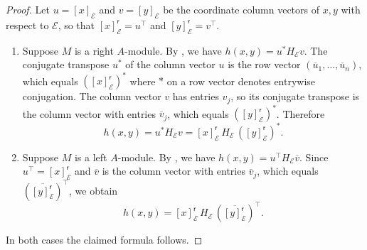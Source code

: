 \begin{proof}
    Let $u = [x]_\mathcal{E}$ and $v = [y]_\mathcal{E}$ be the coordinate column vectors of $x,y$ with respect to $\mathcal{E}$, so that $[x]_\mathcal{E}^{\mathsf{r}} = u^\top$ and $[y]_\mathcal{E}^{\mathsf{r}} = v^\top$.

    \begin{enumerate}
        \item Suppose $M$ is a right $A$-module. By , we have $h(x,y) = u^* H_\mathcal{E} v$. The conjugate transpose $u^*$ of the column vector $u$ is the row vector $(\overline{u}_1,\ldots,\overline{u}_n)$, which equals $([x]_\mathcal{E}^{\mathsf{r}})^*$ where $*$ on a row vector denotes entrywise conjugation. The column vector $v$ has entries $v_j$, so its conjugate transpose is the column vector with entries $\overline{v}_j$, which equals $([y]_\mathcal{E}^{\mathsf{r}})^*$. Therefore
        $$h(x,y) = u^* H_\mathcal{E} v = [x]_\mathcal{E}^{\mathsf{r}} \, H_\mathcal{E} \, ([y]_\mathcal{E}^{\mathsf{r}})^*.$$

        \item Suppose $M$ is a left $A$-module. By , we have $h(x,y) = u^\top H_\mathcal{E} \overline{v}$. Since $u^\top = [x]_\mathcal{E}^{\mathsf{r}}$ and $\overline{v}$ is the column vector with entries $\overline{v}_j$, which equals $(\overline{[y]_\mathcal{E}^{\mathsf{r}}})^\top$, we obtain
        $$h(x,y) = [x]_\mathcal{E}^{\mathsf{r}} \, H_\mathcal{E} \, (\overline{[y]_\mathcal{E}^{\mathsf{r}}})^\top.$$
    \end{enumerate}

    In both cases the claimed formula follows.
\end{proof}
